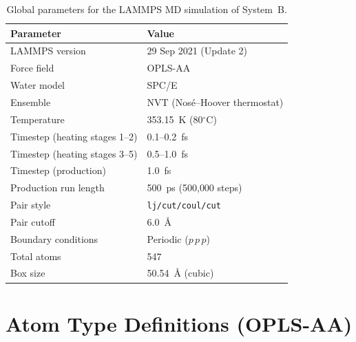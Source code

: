 \documentclass[12pt,a4paper]{report}
\begin{document}
\begin{table}[h]
\centering
\caption{Global parameters for the LAMMPS MD simulation of 
System~B.}
\label{tab:lammps-params}
\begin{tabular}{ll}
\toprule
Parameter & Value \\
\midrule
LAMMPS version & 29 Sep 2021 (Update 2) \\
Force field & OPLS-AA \\
Water model & SPC/E \\
Ensemble & NVT (Nos\'{e}--Hoover thermostat) \\
Temperature & 353.15~K (80\(^\circ\)C) \\
Timestep (heating stages 1--2) & 0.1--0.2~fs \\
Timestep (heating stages 3--5) & 0.5--1.0~fs \\
Timestep (production) & 1.0~fs \\
Production run length & 500~ps (500{,}000 steps) \\
Pair style & \texttt{lj/cut/coul/cut} \\
Pair cutoff & 6.0~\AA{} \\
Boundary conditions & Periodic ($p\,p\,p$) \\
Total atoms & 547 \\
Box size & 50.54~\AA{} (cubic) \\
\bottomrule
\end{tabular}
\end{table}

\section{Atom Type Definitions (OPLS-AA)}
\end{document}

